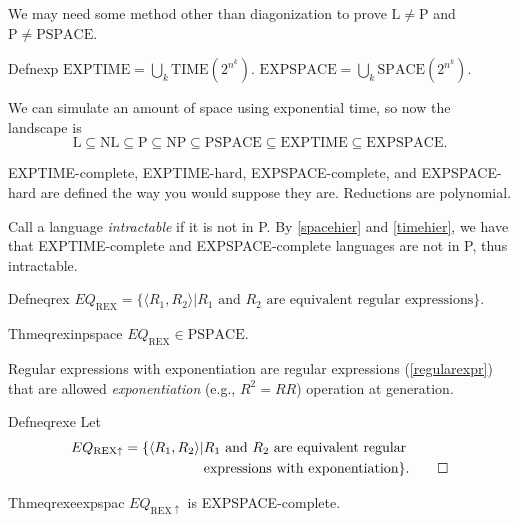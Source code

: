 We may need some method other than diagonization to prove $\mathrm{L}\neq \mathrm{P}$ and $\mathrm{P}\neq \mathrm{PSPACE}$.

\begin{reference}{Defn}{exp}
  $\mathrm{EXPTIME}=\bigcup_k \mathrm{TIME}\left(2^{n^k}\right).$
  $\mathrm{EXPSPACE}=\bigcup_k \mathrm{SPACE}\left(2^{n^k}\right).$
\end{reference}

We can simulate an amount of space using exponential time, so now the landscape is
\[
  \mathrm{L}\subseteq \mathrm{NL}\subseteq \mathrm{P}\subseteq \mathrm{NP}\subseteq \mathrm{PSPACE}\subseteq \mathrm{EXPTIME}\subseteq \mathrm{EXPSPACE}.
\]

EXPTIME-complete, EXPTIME-hard, EXPSPACE-complete, and EXPSPACE-hard are defined the way you would suppose they are. Reductions are polynomial.

Call a language \emph{intractable} if it is not in P. By \ref{spacehier} and \ref{timehier}, we have that EXPTIME-complete and EXPSPACE-complete languages are not in P, thus intractable.

\begin{reference}{Defn}{eqrex}
  $EQ_{\mathrm{REX}}=\{\langle R_1,R_2\rangle|R_1\text{ and }R_2\text{ are equivalent regular expressions}\}.$
\end{reference}

\begin{reference}{Thm}{eqrexinpspace}
  $EQ_{\mathrm{REX}}\in \mathrm{PSPACE}$.
\end{reference}


Regular expressions with exponentiation are regular expressions (\ref{regularexpr}) that are allowed \textit{exponentiation} (e.g., $R^2=RR$) operation at generation.

\begin{reference}{Defn}{eqrexe}
  Let
  \begin{align*}
    EQ_{\mathrm{REX}\uparrow}=\{\langle R_1,R_2\rangle| & R_1\text{ and }R_2\text{ are equivalent regular}  \\
                                                        & \text{expressions with exponentiation}\}.\qedhere
  \end{align*}
\end{reference}

\begin{reference}{Thm}{eqrexeexpspac}
  $EQ_{\mathrm{REX}\uparrow}$ is EXPSPACE-complete.
\end{reference}

